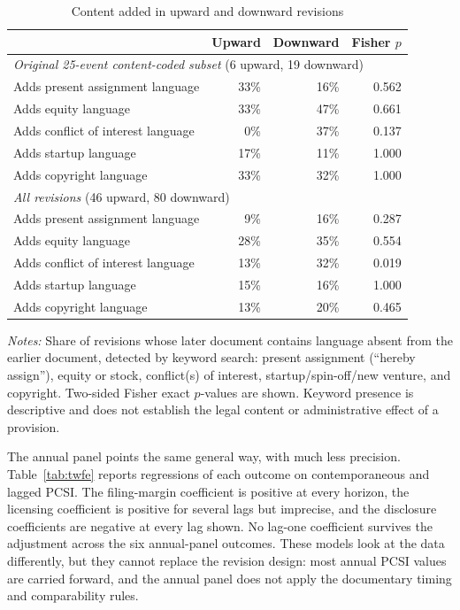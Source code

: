 \begin{table}[htbp]\centering
\caption{Content added in upward and downward revisions}\label{tab:content}
\begin{threeparttable}\small\begin{tabular}{lrrr}\toprule
 & Upward & Downward & Fisher $p$ \\\midrule
\multicolumn{4}{l}{\textit{Original 25-event content-coded subset} (6 upward, 19 downward)} \\
\quad Adds present assignment language & 33\% & 16\% & 0.562 \\
\quad Adds equity language & 33\% & 47\% & 0.661 \\
\quad Adds conflict of interest language & 0\% & 37\% & 0.137 \\
\quad Adds startup language & 17\% & 11\% & 1.000 \\
\quad Adds copyright language & 33\% & 32\% & 1.000 \\
\multicolumn{4}{l}{\textit{All revisions} (46 upward, 80 downward)} \\
\quad Adds present assignment language & 9\% & 16\% & 0.287 \\
\quad Adds equity language & 28\% & 35\% & 0.554 \\
\quad Adds conflict of interest language & 13\% & 32\% & 0.019 \\
\quad Adds startup language & 15\% & 16\% & 1.000 \\
\quad Adds copyright language & 13\% & 20\% & 0.465 \\
\bottomrule\end{tabular}
\begin{tablenotes}[flushleft]\footnotesize
\item \textit{Notes:} Share of revisions whose later document contains language absent from the earlier document, detected by keyword search: present assignment (``hereby assign''), equity or stock, conflict(s) of interest, startup/spin-off/new venture, and copyright. Two-sided Fisher exact $p$-values are shown. Keyword presence is descriptive and does not establish the legal content or administrative effect of a provision.
\end{tablenotes}\end{threeparttable}\end{table}

The annual panel points the same general way, with much less precision. Table~\ref{tab:twfe} reports regressions of each outcome on contemporaneous and lagged PCSI. The filing-margin coefficient is positive at every horizon, the licensing coefficient is positive for several lags but imprecise, and the disclosure coefficients are negative at every lag shown. No lag-one coefficient survives the adjustment across the six annual-panel outcomes. These models look at the data differently, but they cannot replace the revision design: most annual PCSI values are carried forward, and the annual panel does not apply the documentary timing and comparability rules.

